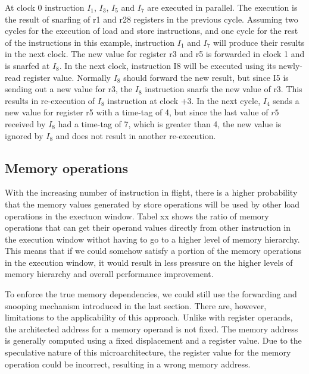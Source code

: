 \documentclass[10pt,twocolumn]{IEEEtran}
\begin{document}
At clock 0 instruction $I_1$, $I_3$, $I_5$ and $I_7$ are executed in
parallel.  The execution is the result of  snarfing of r1 and r28
registers in the previous cycle.  Assuming two cycles for the execution
of load and store instructions, and one cycle for the rest of the
instructions in this example, instruction $I_1$ and $I_7$ will produce
their results in the next clock.  The new value for register r3 and r5
is forwarded in clock 1 and is snarfed at $I_8$.   In the next clock,
instruction I8 will be executed using its newly-read register value.
Normally $I_8$ should forward the new result, but since I5 is sending
out a new value for r3, the $I_8$ instruction snarfs the new value of
r3. This results in re-execution of $I_8$ instruction at clock +3.  In
the next cycle, $I_4$ sends a new value for register r5 with a time-tag
of 4, but since the last value of $r5$ received by $I_8$ had a time-tag
of 7, which is greater than 4, the new value is ignored by $I_8$ and
does not result in another re-execution.

\subsection {Memory operations}

With the increasing number of instruction in flight, there is a higher
probability that the memory values generated by store operations will
be used by other load operations in the exectuon window.  Tabel xx
shows the ratio of memory operations that can get their operand values
directly from other instruction in the execution window withot having
to go to a higher level of memory hierarchy.  This means that if we
could somehow satisfy a portion of the memory operations in the
execution window, it would result in less pressure on the higher levels
of memory hierarchy and overall performance improvement.

To enforce the true memory dependencies, we could still use the
forwarding and snooping mechanism introduced in the last section.
There are, however, limitations to the applicability of this approach.
Unlike with register operands, the architected address for a memory
operand is not fixed.  The memory address is generally computed using a
fixed displacement and a register value.  Due to the speculative nature
of this microarchitecture, the register value for the memory operation
could be incorrect, resulting in a wrong memory address.
\end{document}

